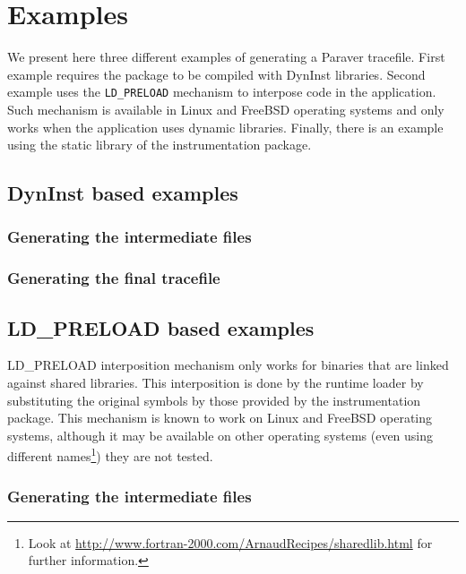 \chapter{Examples}\label{cha:Examples}

We present here three different examples of generating a Paraver tracefile. First example requires the package to be compiled with DynInst libraries. Second example uses the {\tt LD\_PRELOAD} mechanism to interpose code in the application. Such mechanism is available in Linux and FreeBSD operating systems and only works when the application uses dynamic libraries. Finally, there is an example using the static library of the instrumentation package.

\section{DynInst based examples}\label{sec:Examples_DynInst}

\subsection{Generating the intermediate files}\label{subsec:Examples_DynInst_Intermediate}

\subsection{Generating the final tracefile}\label{subsec:Examples_DynInst_Final}

\section{LD\_PRELOAD based examples}\label{sec:Examples_LDPRELOAD}

LD\_PRELOAD interposition mechanism only works for binaries that are linked against shared libraries. This interposition is done by the runtime loader by substituting the original symbols by those provided by the instrumentation package. This mechanism is known to work on Linux and FreeBSD operating systems, although it may be available on other operating systems (even using different names\footnote{Look at \url{http://www.fortran-2000.com/ArnaudRecipes/sharedlib.html} for further information.}) they are not tested.

\subsection{Generating the intermediate files}\label{subsec:Examples_LDPRELOAD_Intermediate}


